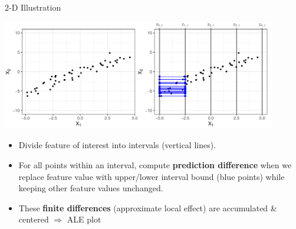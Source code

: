 \documentclass[11pt,compress,t,notes=noshow, aspectratio=169, xcolor=table]{beamer}
\begin{document}
\begin{frame}{2-D Illustration}

\centerline{\includegraphics[width=0.9\textwidth]{figure/ale_interval}}

\begin{itemize}
\item Divide feature of interest into intervals (vertical lines).
\item For all points within an interval, compute \textbf{prediction difference} when we replace feature value with upper/lower interval bound (blue points) while keeping other feature values unchanged.
\item These \textbf{finite differences} (approximate local effect) are accumulated \& centered $\Rightarrow$ ALE plot %
\end{itemize}

\end{frame}
\end{document}
